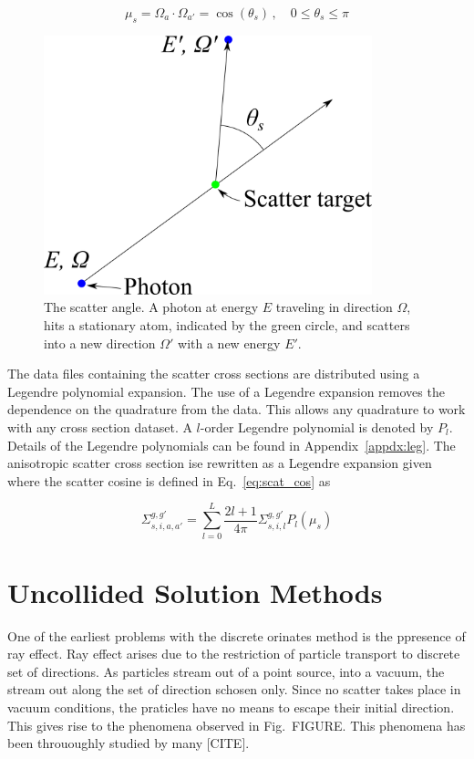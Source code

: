 \begin{equation} \label{eq:scat_cos}
\mu_s = \Omega_a \cdot \Omega_{a'} = \cos(\theta_s) \,, \quad 0 \leq \theta_s \leq \pi
\end{equation}

\begin{figure}[tb]
  \begin{center}
   \includegraphics[width=3.75in]{figs/scat_ang}
  \end{center}
  \caption{The scatter angle. A photon at energy $E$ traveling in direction $\Omega$, hits a stationary atom, indicated by the green circle, and scatters into a new direction $\Omega'$ with a new energy $E'$.}
\label{fig:scat_ang}
\end{figure}%

The data files containing the scatter cross sections are distributed using a Legendre polynomial expansion. The use of a Legendre expansion removes the dependence on the quadrature from the data. This allows any quadrature to work with any cross section dataset. A $l$-order Legendre polynomial is denoted by $P_l$. Details of the Legendre polynomials can be found in Appendix~\ref{appdx:leg}. The anisotropic scatter cross section ise rewritten as a Legendre expansion given where the scatter cosine is defined in Eq.~\ref{eq:scat_cos} as

\begin{equation} \label{eq:leg_1}
\Sigma_{s, i, a, a'}^{g, g'} = \sum_{l=0}^L \frac{2l+1}{4 \pi}\Sigma_{s, i, l}^{g, g'} P_l(\mu_s)
\end{equation}



\section{Uncollided Solution Methods}\label{sec:uncol}
One of the earliest problems with the discrete orinates method is the ppresence of ray effect. Ray effect arises due to the restriction of particle transport to discrete set of directions. As particles stream out of a point source, into a vacuum, the stream out along the set of direction schosen only. Since no scatter takes place in vacuum conditions, the praticles have no means to escape their initial direction. This gives rise to the phenomena observed in Fig.~FIGURE. This phenomena has been thrououghly studied by many [CITE].

